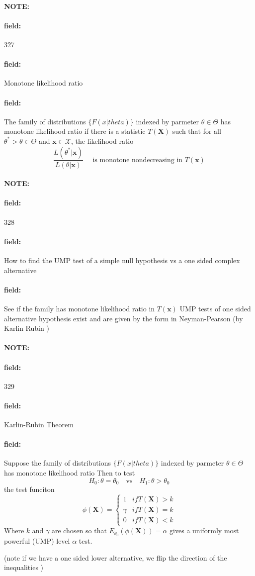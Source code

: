 \documentclass[12pt]{article}
\newenvironment{note}{\paragraph{NOTE:}}{}
\newenvironment{field}{\paragraph{field:}}{}
\begin{document}
\begin{note}
    \begin{field}
        \tiny 327
    \end{field}
    \begin{field}
        Monotone likelihood ratio
    \end{field}
    \begin{field}
        The family of distributions $\{F(x|theta)\}$ indexed by parmeter $\theta \in \Theta$ has monotone likelihood ratio if there is a statistic $T(\mathbf{X})$ such that for all $\theta^* > \theta \in \Theta$ and $\mathbf{x} \in \mathscr{X}$, the likelihood ratio $$ \frac{L(\theta^*|\mathbf{x})}{L(\theta|\mathbf{x})} \quad \text{ is monotone nondecreasing in } T(\mathbf{x})$$
    \end{field}
\end{note}

\begin{note}
    \begin{field}
        \tiny 328
    \end{field}
    \begin{field}
        How to find the UMP test of a simple null hypothesis vs a one sided complex alternative
    \end{field}
    \begin{field}
        See if the family has monotone likelihood ratio in $T(\mathbf{x})$
        UMP tests of one sided alternative hypothesis exist and are given by the form in Neyman-Pearson (by Karlin Rubin )
    \end{field}
\end{note}

\begin{note}
    \begin{field}
        \tiny 329
    \end{field}
    \begin{field}
        Karlin-Rubin Theorem
    \end{field}
    \begin{field}
        Suppose the family of distributions $\{F(x|theta)\}$ indexed by parmeter $\theta \in \Theta$ has monotone likelihood ratio Then to test $$ H_0: \theta = \theta_0 \quad \text{vs} \quad H_1: \theta > \theta_0$$
         the test funciton
         \[
           \phi(\mathbf{X}) =
           \begin{cases}
                1 & if T(\mathbf{X}) > k  \\
                \gamma & if T(\mathbf{X}) = k\\
                0 & if T(\mathbf{X}) < k
           \end{cases}
         \]
         Where $k$ and $\gamma$ are chosen so that $E_{\theta_0}(\phi(\mathbf{X})) = \alpha$ gives a uniformly most powerful (UMP) level $\alpha$ test.

         (note if we have a one sided lower alternative, we flip the direction of the inequalities )
    \end{field}
\end{note}
\end{document}
